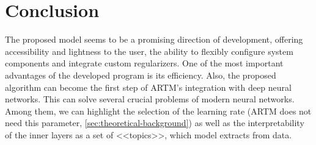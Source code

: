 \documentclass{article}
\begin{document}
\section{\centering Conclusion}
The proposed model seems to be a promising direction of development, offering accessibility and lightness to the user, the ability to flexibly configure system components and integrate custom regularizers. One of the most important advantages of the developed program is its efficiency. Also, the proposed algorithm can become the first step of ARTM's integration with deep neural networks. This can solve several crucial problems of modern neural networks. Among them, we can highlight the selection of the learning rate (ARTM does not need this parameter, \ref{sec:theoretical-background}) as well as the interpretability of the inner layers as a set of <<topics>>, which model extracts from data.





% 






\end{document}
